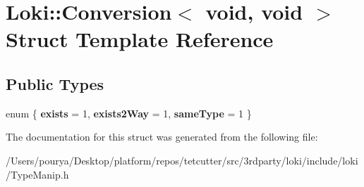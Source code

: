 \hypertarget{structLoki_1_1Conversion_3_01void_00_01void_01_4}{}\section{Loki\+:\+:Conversion$<$ void, void $>$ Struct Template Reference}
\label{structLoki_1_1Conversion_3_01void_00_01void_01_4}
\subsection*{Public Types}
\begin{DoxyCompactItemize}
\item 
\hypertarget{structLoki_1_1Conversion_3_01void_00_01void_01_4_aeb7a8ec6818d8f4e9aa1a723f44dc3b0}{}enum \{ {\bfseries exists} = 1, 
{\bfseries exists2\+Way} = 1, 
{\bfseries same\+Type} = 1
 \}\label{structLoki_1_1Conversion_3_01void_00_01void_01_4_aeb7a8ec6818d8f4e9aa1a723f44dc3b0}

\end{DoxyCompactItemize}


The documentation for this struct was generated from the following file\+:\begin{DoxyCompactItemize}
\item 
/\+Users/pourya/\+Desktop/platform/repos/tetcutter/src/3rdparty/loki/include/loki/Type\+Manip.\+h\end{DoxyCompactItemize}
